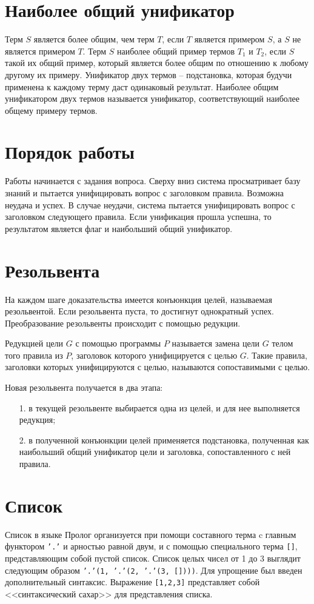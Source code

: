 \section{Наиболее общий унификатор}
Терм \(S\) является более общим, чем терм \(T\), если \(T\) является примером  \(S\), а \(S\) не является примером \(T\).
Терм \(S\) наиболее общий пример термов \(T_1\) и \(T_2\), если \(S\) такой их общий пример, который является более общим по отношению к любому другому их примеру. Унификатор двух термов -- подстановка, которая будучи применена к каждому терму даст одинаковый результат. Наиболее общим унификатором двух термов называется унификатор, соответствующий наиболее общему примеру термов. 
 
\section{Порядок работы}
Работы начинается с задания вопроса. Сверху вниз система просматривает базу знаний и пытается унифицировать вопрос с заголовком правила. Возможна неудача и успех. В случае неудачи, система пытается унифицировать вопрос с заголовком следующего правила. Если  унификация прошла успешна, то результатом является флаг и наибольший общий унификатор.

\section{Резольвента}
На каждом шаге доказательства имеется конъюнкция целей, называемая резольвентой. Если резольвента пуста, то достигнут однократный успех. Преобразование резольвенты происходит с помощью редукции.

Редукцией цели \(G\) с помощью программы \(P\) называется замена цели \(G\) телом того правила из \(P\), заголовок которого унифицируется с целью \(G\). Такие правила, заголовки которых унифицируются с целью, называются сопоставимыми с целью.
 
Новая резольвента получается в два этапа:
\begin{itemize}
	\item [1.] в текущей резольвенте выбирается одна из целей, и для нее выполняется редукция;
	\item [2.] в полученной конъюнкции целей применяется подстановка, полученная как наибольший общий унификатор цели и заголовка, сопоставленного с ней правила.
\end{itemize}

\section{Список}
Список в языке Пролог организуется при помощи составного терма c главным функтором \texttt{'.'} и арностью равной двум, и с помощью специального терма \texttt{[]}, представляющим собой пустой список. Список целых чисел от 1 до 3 выглядит следующим образом \texttt{'.'(1, '.'(2, '.'(3, [])))}. Для упрощение был введен дополнительный синтаксис. Выражение \texttt{[1,2,3]} представляет собой <<синтаксический сахар>> для представления списка.